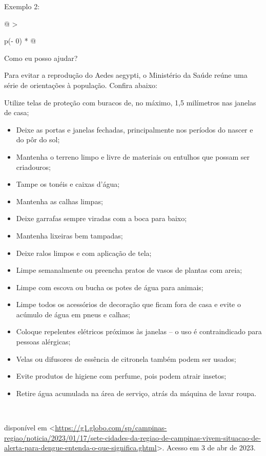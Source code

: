 {Exemplo 2:

\begin{longtable}[]{@{}
  >{\raggedright\arraybackslash}p{(\columnwidth - 0\tabcolsep) * }@{}}
\toprule
\endhead
\begin{minipage}[t]{\linewidth}\raggedright
Como eu posso ajudar?

Para evitar a reprodução do Aedes aegypti, o Ministério da Saúde reúne
uma série de orientações à população. Confira abaixo:

Utilize telas de proteção com buracos de, no máximo, 1,5 milímetros nas
janelas de casa;

\begin{itemize}
\item
  Deixe as portas e janelas fechadas, principalmente nos períodos do
  nascer e do pôr do sol;
\item
  Mantenha o terreno limpo e livre de materiais ou entulhos que possam
  ser criadouros;
\item
  Tampe os tonéis e caixas d'água;
\item
  Mantenha as calhas limpas;
\item
  Deixe garrafas sempre viradas com a boca para baixo;
\item
  Mantenha lixeiras bem tampadas;
\item
  Deixe ralos limpos e com aplicação de tela;
\item
  Limpe semanalmente ou preencha pratos de vasos de plantas com areia;
\item
  Limpe com escova ou bucha os potes de água para animais;
\item
  Limpe todos os acessórios de decoração que ficam fora de casa e evite
  o acúmulo de água em pneus e calhas;
\item
  Coloque repelentes elétricos próximos às janelas -- o uso é
  contraindicado para pessoas alérgicas;
\item
  Velas ou difusores de essência de citronela também podem ser usados;
\item
  Evite produtos de higiene com perfume, pois podem atrair insetos;
\item
  Retire água acumulada na área de serviço, atrás da máquina de lavar
  roupa.
\end{itemize}
\end{minipage} \\
\bottomrule
\end{longtable}

disponível em
\textless{}\href{https://g1.globo.com/sp/campinas-regiao/noticia/2023/01/17/sete-cidades-da-regiao-de-campinas-vivem-situacao-de-alerta-para-dengue-entenda-o-que-significa.ghtml}{\uline{https://g1.globo.com/sp/campinas-regiao/noticia/2023/01/17/sete-cidades-da-regiao-de-campinas-vivem-situacao-de-alerta-para-dengue-entenda-o-que-significa.ghtml}}\textgreater.
Acesso em 3 de abr de 2023.

}
